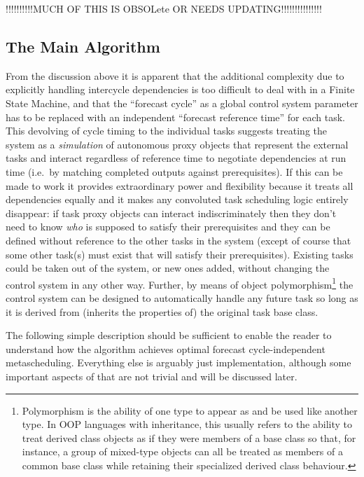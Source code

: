 

!!!!!!!!!!MUCH OF THIS IS OBSOLete OR NEEDS UPDATING!!!!!!!!!!!!!!!

\subsection{The Main Algorithm}

From the discussion above it is apparent that the additional complexity
due to explicitly handling intercycle dependencies is too difficult to
deal with in a Finite State Machine, and that the ``forecast cycle'' as
a global control system parameter has to be replaced with an independent
``forecast reference time'' for each task. This devolving of cycle
timing to the individual tasks suggests treating the system as a {\em
simulation} of autonomous proxy objects that represent the external
tasks and interact regardless of reference time to negotiate
dependencies at run time (i.e.\ by matching completed outputs against
prerequisites). If this can be made to work it provides extraordinary
power and flexibility because it treats all dependencies equally and it
makes any convoluted task scheduling logic entirely disappear: if task
proxy objects can interact indiscriminately then they don't need to know
{\em who} is supposed to satisfy their prerequisites and they can be
defined without reference to the other tasks in the system (except of
course that some other task(s) must exist that will satisfy their
prerequisites).  Existing tasks could be taken out of the system, or new
ones added, without changing the control system in any other way.
Further, by means of object polymorphism\footnote{Polymorphism is the
ability of one type to appear as and be used like another type. In OOP
languages with inheritance, this usually refers to the ability to treat
derived class objects as if they were members of a base class so that,
for instance, a group of mixed-type objects can all be treated as
members of a common base class while retaining their specialized derived
class behaviour.} the control system can be designed to automatically
handle any future task so long as it is derived from (inherits the
properties of) the original task base class.

The following simple description should be sufficient to enable the
reader to understand how the algorithm achieves optimal forecast
cycle-independent metascheduling. Everything else is arguably just
implementation, although some important aspects of that are not trivial
and will be discussed later.

